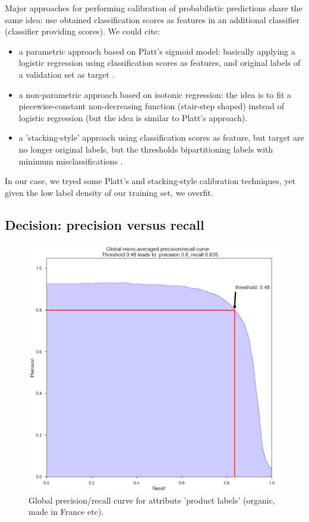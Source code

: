 Major approaches for performing calibration of probabilistic predictions share the same idea: use obtained classification scores as features in an additional classifier (classifier providing scores). We could cite: 
\begin{itemize}
	\item a parametric approach based on Platt’s sigmoid model: basically applying a logistic regression using classification scores as features, and original labels of a validation set as target \cite{Calibration}.
	\item a non-parametric approach based on isotonic regression: the idea is to fit a piecewise-constant non-decreasing function (stair-step shaped) instead of logistic regression (but the idea is similar to Platt's approach).
	\item a 'stacking-style' approach using classification scores as feature, but target are no longer original labels, but the thresholds bipartitioning labels with minimum misclassifications \cite{MultilabelReview}.
\end{itemize}

In our case, we tryed some Platt's and stacking-style calibration techniques, yet given the low label density of our training set, we overfit.

\subsection{Decision: precision versus recall}

\begin{figure}[H]
\centering
\includegraphics[scale=0.4]{./images/calibration/islabeledby_global_curve.png}
\caption{Global precision/recall curve for attribute 'product labels' (organic, made in France etc).}
\end{figure}

